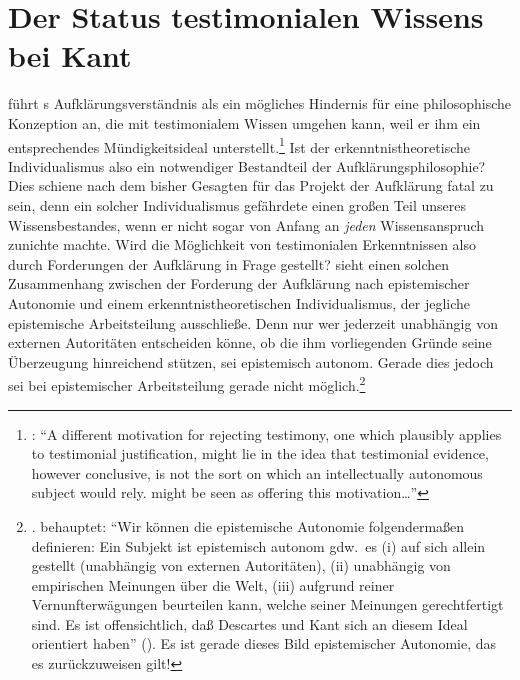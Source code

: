 \section{Der Status testimonialen Wissens bei Kant}
\label{Absatz:AufklaerungundZugangsInternalismus}
 führt s
Aufklärungsverständnis als ein mögliches Hindernis für eine philosophische
Konzeption an, die mit testimonialem Wissen umgehen kann, weil er ihm ein
entsprechendes Mündigkeitsideal
unterstellt.\footnote{\cite[Vgl.][46]{Schmitt:JustificationSocialityandAutonomy1987}:
\enquote{A different motivation for rejecting testimony, one which plausibly
applies to testimonial justification, might lie in the idea that testimonial
evidence, however conclusive, is not the sort on which an intellectually
autonomous subject would rely.  might be seen as offering this
motivation\dots}} Ist der
erkenntnistheoretische Individualismus also ein notwendiger Bestandteil der
Aufklärungsphilosophie? Dies schiene nach dem bisher Gesagten für das Projekt
der Aufklärung fatal zu sein, denn ein solcher Individualismus gefährdete einen
großen Teil unseres Wissensbestandes, wenn er nicht sogar von Anfang an \emph{jeden} Wissensanspruch
zunichte machte. Wird die Möglichkeit von testimonialen Erkenntnissen also durch
Forderungen der Aufklärung in Frage gestellt?
sieht einen solchen Zusammenhang zwischen der Forderung der Aufklärung nach
epistemischer Autonomie und einem erkenntnistheoretischen Individualismus, der
jegliche epistemische Arbeitsteilung ausschließe. Denn nur wer jederzeit
unabhängig von externen Autoritäten entscheiden könne, ob die ihm vorliegenden
Gründe seine Überzeugung hinreichend stützen, sei epistemisch autonom. Gerade
dies jedoch sei bei epistemischer Arbeitsteilung gerade nicht
möglich.\footnote{\cite[Vgl.][15--17]{Grundmann:DietraditionelleErkenntnistheorieundihreHerausforderer2001}.
 behauptet: \enquote{Wir können die epistemische
Autonomie folgendermaßen definieren: Ein Subjekt ist epistemisch autonom gdw.~es
(i) auf sich allein gestellt (unabhängig von externen Autoritäten), (ii)
unabhängig von empirischen Meinungen über die Welt, (iii) aufgrund reiner
Vernunfterwägungen beurteilen kann, welche seiner Meinungen gerechtfertigt sind.
Es ist offensichtlich, daß Descartes und Kant sich an diesem Ideal orientiert
haben}
(\cite[][17]{Grundmann:DietraditionelleErkenntnistheorieundihreHerausforderer2001}).
Es ist gerade dieses Bild epistemischer Autonomie, das es zurückzuweisen gilt!}
